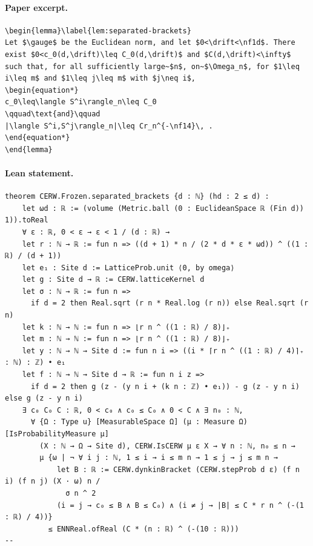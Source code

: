 \paragraph{Paper excerpt.}
\begin{verbatim}
\begin{lemma}\label{lem:separated-brackets}
Let $\gauge$ be the Euclidean norm, and let $0<\drift<\nf1d$. There exist $0<c_0(d,\drift)\leq C_0(d,\drift)$ and $C(d,\drift)<\infty$ such that, for all sufficiently large~$n$, on~$\Omega_n$, for $1\leq i\leq m$ and $1\leq j\leq m$ with $j\neq i$,
\begin{equation*}
c_0\leq\langle S^i\rangle_n\leq C_0
\qquad\text{and}\qquad
|\langle S^i,S^j\rangle_n|\leq Cr_n^{-\nf14}\, .
\end{equation*}
\end{lemma}
\end{verbatim}
\paragraph{Lean statement.}
\begin{verbatim}
theorem CERW.Frozen.separated_brackets {d : ℕ} (hd : 2 ≤ d) :
    let ωd : ℝ := (volume (Metric.ball (0 : EuclideanSpace ℝ (Fin d)) 1)).toReal
    ∀ ε : ℝ, 0 < ε → ε < 1 / (d : ℝ) →
    let r : ℕ → ℝ := fun n => ((d + 1) * n / (2 * d * ε * ωd)) ^ ((1 : ℝ) / (d + 1))
    let e₁ : Site d := LatticeProb.unit ⟨0, by omega⟩
    let g : Site d → ℝ := CERW.latticeKernel d
    let σ : ℕ → ℝ := fun n =>
      if d = 2 then Real.sqrt (r n * Real.log (r n)) else Real.sqrt (r n)
    let k : ℕ → ℕ := fun n => ⌊r n ^ ((1 : ℝ) / 8)⌋₊
    let m : ℕ → ℕ := fun n => ⌊r n ^ ((1 : ℝ) / 8)⌋₊
    let y : ℕ → ℕ → Site d := fun n i => ((i * ⌈r n ^ ((1 : ℝ) / 4)⌉₊ : ℕ) : ℤ) • e₁
    let f : ℕ → ℕ → Site d → ℝ := fun n i z =>
      if d = 2 then g (z - (y n i + (k n : ℤ) • e₁)) - g (z - y n i) else g (z - y n i)
    ∃ c₀ C₀ C : ℝ, 0 < c₀ ∧ c₀ ≤ C₀ ∧ 0 < C ∧ ∃ n₀ : ℕ,
      ∀ {Ω : Type u} [MeasurableSpace Ω] (μ : Measure Ω) [IsProbabilityMeasure μ]
        (X : ℕ → Ω → Site d), CERW.IsCERW μ ε X → ∀ n : ℕ, n₀ ≤ n →
        μ {ω | ¬ ∀ i j : ℕ, 1 ≤ i → i ≤ m n → 1 ≤ j → j ≤ m n →
            let B : ℝ := CERW.dynkinBracket (CERW.stepProb d ε) (f n i) (f n j) (X · ω) n /
              σ n ^ 2
            (i = j → c₀ ≤ B ∧ B ≤ C₀) ∧ (i ≠ j → |B| ≤ C * r n ^ (-(1 : ℝ) / 4))}
          ≤ ENNReal.ofReal (C * (n : ℝ) ^ (-(10 : ℝ)))
--
\end{verbatim}

